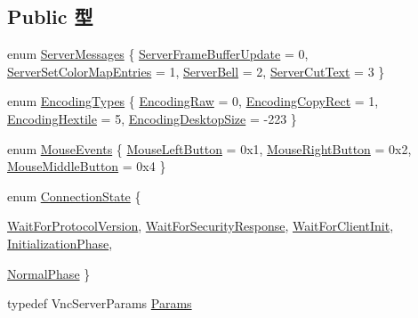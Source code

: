 \subsection*{Public 型}
\begin{DoxyCompactItemize}
\item 
enum \hyperlink{group__VncConstants_ga98f897c5a38e76e2cc7fea4d87083a84}{ServerMessages} \{ \hyperlink{group__VncConstants_gga98f897c5a38e76e2cc7fea4d87083a84afb5f87db0a4610309f486463de5388b7}{ServerFrameBufferUpdate} =  0, 
\hyperlink{group__VncConstants_gga98f897c5a38e76e2cc7fea4d87083a84aba175e2ce5c7225c9945f1e133857c07}{ServerSetColorMapEntries} =  1, 
\hyperlink{group__VncConstants_gga98f897c5a38e76e2cc7fea4d87083a84a32aadc1d2674e65c0f598a2727945b8d}{ServerBell} =  2, 
\hyperlink{group__VncConstants_gga98f897c5a38e76e2cc7fea4d87083a84ad80502eb07cc53ade0e84460d0c39e7c}{ServerCutText} =  3
 \}
\item 
enum \hyperlink{group__VncConstants_ga0b9039f87c8a2980c4a6ab14b511760a}{EncodingTypes} \{ \hyperlink{group__VncConstants_gga0b9039f87c8a2980c4a6ab14b511760aa2929e8976a78e5a5e8829beae2a7e69e}{EncodingRaw} =  0, 
\hyperlink{group__VncConstants_gga0b9039f87c8a2980c4a6ab14b511760aac66141a54bb407b18d3ab26e779bc4a8}{EncodingCopyRect} =  1, 
\hyperlink{group__VncConstants_gga0b9039f87c8a2980c4a6ab14b511760aa2e2676a7c0aac5891c51c5d4325453f7}{EncodingHextile} =  5, 
\hyperlink{group__VncConstants_gga0b9039f87c8a2980c4a6ab14b511760aa81cbe670fb7e962f4721e74d55bc66e5}{EncodingDesktopSize} =  -\/223
 \}
\item 
enum \hyperlink{group__VncConstants_ga0aa77c5c19bd1f953c90f0cae8c61a9a}{MouseEvents} \{ \hyperlink{group__VncConstants_gga0aa77c5c19bd1f953c90f0cae8c61a9aa13ee718768549ed254378457536bfd63}{MouseLeftButton} =  0x1, 
\hyperlink{group__VncConstants_gga0aa77c5c19bd1f953c90f0cae8c61a9aa9722dcc9b50f713f587a1b046e108b27}{MouseRightButton} =  0x2, 
\hyperlink{group__VncConstants_gga0aa77c5c19bd1f953c90f0cae8c61a9aaa93c27c34acd42cdc9e28a8f668d87dd}{MouseMiddleButton} =  0x4
 \}
\item 
enum \hyperlink{group__VncConstants_gacdd867d72142510ce53521a63a062f9b}{ConnectionState} \{ \par
\hyperlink{group__VncConstants_ggacdd867d72142510ce53521a63a062f9ba79cc83bc90b4f683fb2495d4487662ea}{WaitForProtocolVersion}, 
\hyperlink{group__VncConstants_ggacdd867d72142510ce53521a63a062f9ba198ea2412a93ac253bf8e4406a8fb06c}{WaitForSecurityResponse}, 
\hyperlink{group__VncConstants_ggacdd867d72142510ce53521a63a062f9ba78e807adbaddb74b84dea34150fab20e}{WaitForClientInit}, 
\hyperlink{group__VncConstants_ggacdd867d72142510ce53521a63a062f9badd4438c090c589c90c368d163c4edbd9}{InitializationPhase}, 
\par
\hyperlink{group__VncConstants_ggacdd867d72142510ce53521a63a062f9ba6302b1455052baff1528e67e95db429a}{NormalPhase}
 \}
\item 
typedef VncServerParams \hyperlink{classVncServer_a9bc94e8c47d227e70719e2f0b14d23d8}{Params}
\end{DoxyCompactItemize}
